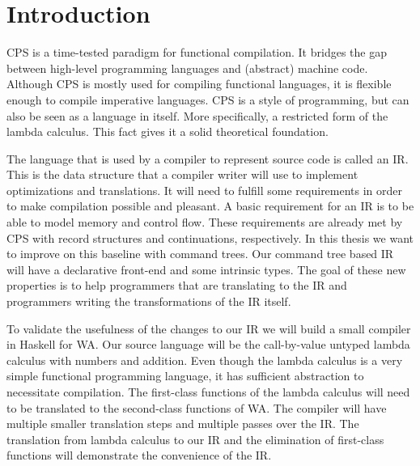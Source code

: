 
\chapter{\label{chap:introduction}Introduction}

CPS is a time-tested paradigm for functional compilation\autocite{steele1978rabbit, DBLP:books/daglib/0022396}. It bridges the gap between high-level programming languages and (abstract) machine code. Although \ac{CPS} is mostly used for compiling functional languages, it is flexible enough to compile imperative languages. \ac{CPS} is a style of programming, but can also be seen as a language in itself. More specifically, a restricted form of the lambda calculus\autocite{barendregt1984lambda}. This fact gives it a solid theoretical foundation.


The language that is used by a compiler to represent source code is called an \ac{IR}. This is the data structure that a compiler writer will use to implement optimizations and translations. It will need to fulfill some requirements in order to make compilation possible and pleasant. A basic requirement for an \ac{IR} is to be able to model memory and control flow\autocite{bruin2020framevm}. These requirements are already met by \ac{CPS} with record structures and continuations, respectively. In this thesis we want to improve on this baseline with command trees\autocite{commandtreespoulsen}. Our command tree based \ac{IR} will have a declarative front-end and some intrinsic types. The goal of these new properties is to help programmers that are translating to the \ac{IR} and programmers writing the transformations of the \ac{IR} itself.

To validate the usefulness of the changes to our \ac{IR} we will build a small compiler in Haskell\autocite{haskellhomepage} for \ac{WA}\autocite{webassemblyhomepage}. Our source language will be the call-by-value untyped lambda calculus with numbers and addition. Even though the lambda calculus is a very simple functional programming language, it has sufficient abstraction to necessitate compilation. The first-class functions of the lambda calculus will need to be translated to the second-class functions of \ac{WA}. The compiler will have multiple smaller translation steps and multiple passes over the \ac{IR}. The translation from lambda calculus to our \ac{IR} and the elimination of first-class functions will demonstrate the convenience of the \ac{IR}.

